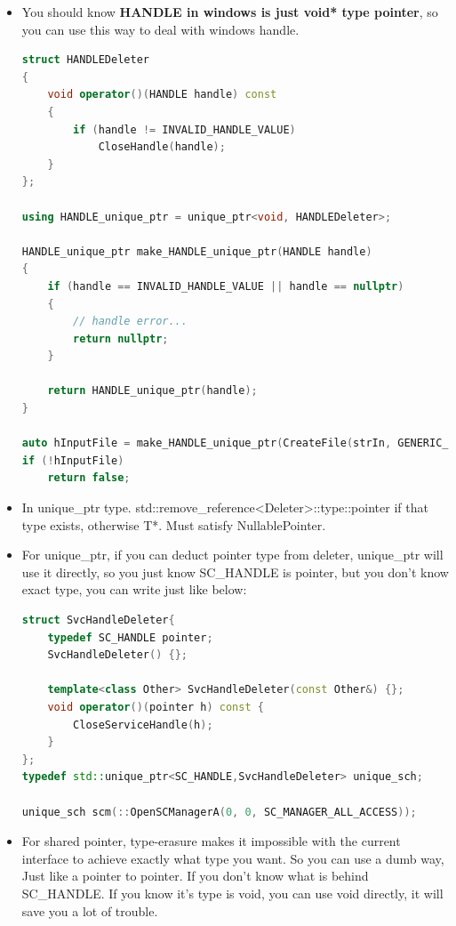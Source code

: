 \documentclass[a4paper,12pt,twoside]{book}
\begin{document}
\begin{itemize}
\item You should know \textbf{HANDLE in windows is just void* type pointer}, so you can use this way to deal with windows handle.

\begin{lstlisting}[frame=single, language=c++]
struct HANDLEDeleter
{
    void operator()(HANDLE handle) const
    {
        if (handle != INVALID_HANDLE_VALUE)
            CloseHandle(handle);
    }
};

using HANDLE_unique_ptr = unique_ptr<void, HANDLEDeleter>;

HANDLE_unique_ptr make_HANDLE_unique_ptr(HANDLE handle)
{
    if (handle == INVALID_HANDLE_VALUE || handle == nullptr)
    {
        // handle error...
        return nullptr;
    }

    return HANDLE_unique_ptr(handle);
}

auto hInputFile = make_HANDLE_unique_ptr(CreateFile(strIn, GENERIC_READ, ...));
if (!hInputFile)
    return false;

\end{lstlisting}

\item In unique\_ptr type. std::remove\_reference<Deleter>::type::pointer if that type exists, otherwise T*. Must satisfy NullablePointer.

\item For unique\_ptr, if you can deduct pointer type from deleter, unique\_ptr will use it directly, so you just know SC\_HANDLE is pointer, but you don't know exact type, you can write just like below: 
\begin{lstlisting}[frame=single, language=c++]
struct SvcHandleDeleter{
    typedef SC_HANDLE pointer;
    SvcHandleDeleter() {};

    template<class Other> SvcHandleDeleter(const Other&) {};
    void operator()(pointer h) const {
        CloseServiceHandle(h);
    }
};
typedef std::unique_ptr<SC_HANDLE,SvcHandleDeleter> unique_sch;

unique_sch scm(::OpenSCManagerA(0, 0, SC_MANAGER_ALL_ACCESS));
\end{lstlisting}



\item For shared pointer, type-erasure makes it impossible with the current interface to achieve exactly what type you want. So you can use a dumb way, Just like a pointer to pointer. If you don't know what is behind SC\_HANDLE. If you know it's type is void, you can use void directly, it will save you a lot of trouble. 


\end{itemize}
\end{document}
